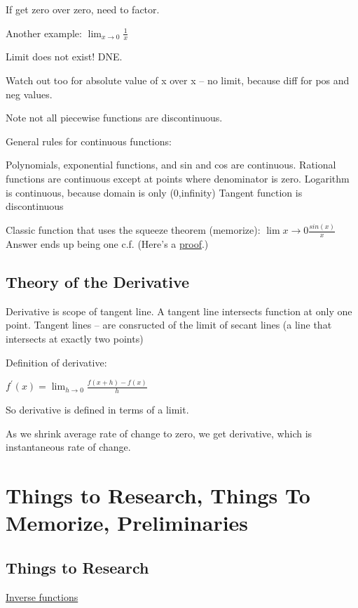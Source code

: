 \documentclass[12pt, letterpaper]{article}
\begin{document}
If get zero over zero, need to factor.

\vspace{5mm}

Another example: \(
    \lim_{x \to 0}\frac{1}{x}
\)

\vspace{5mm}
Limit does not exist!  DNE.

Watch out too for absolute value of x over x -- no limit, because diff for pos and neg values.

Note not all piecewise functions are discontinuous.

General rules for continuous functions:

Polynomials, exponential functions, and sin and cos are continuous.
Rational functions are continuous except at points where denominator is zero.
Logarithm is continuous, because domain is only (0,infinity)
Tangent function is discontinuous

\vspace{1cm}
Classic function that uses the squeeze theorem (memorize):
\(\lim{x \to 0}\frac{sin(x)}{x}\)
Answer ends up being one c.f. (Here's a \href{http://ime.math.arizona.edu/g-teams/Profiles/JS/Calc/SqueezeTheorem.pdf}{proof}.)

\subsection{Theory of the Derivative}
Derivative is scope of tangent line.
A tangent line intersects function at only one point.
Tangent lines -- are consructed of the limit of secant lines (a line that intersects at exactly two points)
\vspace{.5cm}

Definition of derivative:

\vspace{.5cm}

$f^\prime{(x)} = \lim_{h \to 0} \frac{f(x + h) - f(x)}{h}   $


So derivative is defined in terms of a limit.

As we shrink average rate of change to zero, we get derivative, which is instantaneous rate of change.

\section{Things to Research, Things To Memorize, Preliminaries}
\subsection{Things to Research}
\href{https://www.khanacademy.org/math/algebra/x2f8bb11595b61c86:functions/x2f8bb11595b61c86:inverse-functions-intro/v/introduction-to-function-inverses}{Inverse functions}
\end{document}
